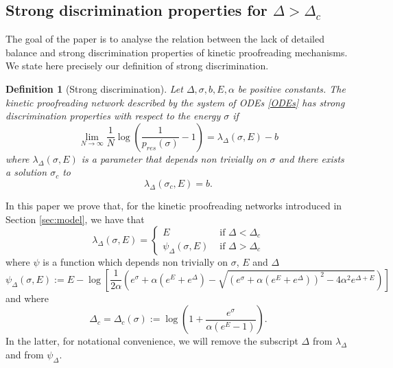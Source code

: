 \documentclass{article}
\numberwithin{equation}{section}
\theoremstyle{plain}
\newtheorem{definition}[theorem]{Definition}
\begin{document}
\subsection{Strong discrimination properties for $\Delta > \Delta_c$ }
The goal of the paper is to analyse the relation between the lack of detailed balance and strong discrimination properties of kinetic proofreading mechanisms. We state here  precisely our definition of strong discrimination. 
\begin{definition}[Strong discrimination] \label{def:strong discr}
Let $\Delta, \sigma, b, E , \alpha  $ be positive constants. 
    The kinetic proofreading network described by the system of ODEs \eqref{ODEs} has strong discrimination properties with respect to the energy $\sigma$  if 
\begin{equation} \label{strong disc}
\lim_{N \to \infty}    \frac{1}{N } \log \left( \frac{1}{p_{res} (\sigma) } - 1 \right) = \lambda_\Delta (\sigma, E) - b 
\end{equation}
    where  $ \lambda_\Delta (\sigma, E )$ is a parameter that depends non trivially on  $\sigma $  and there exists a solution $\sigma_c $ to 
    \begin{equation} \label{sigma cirt}
\lambda_\Delta(\sigma_c, E)= b. 
\end{equation} 
\end{definition}
In this paper we prove that, for the kinetic proofreading networks introduced in Section \ref{sec:model}, we have that
\begin{equation} \label{lambda}
\lambda_\Delta  (\sigma, E )=\begin{cases}  E &\text{ if } \Delta < \Delta_c \\
\psi_\Delta (\sigma, E) &\text{ if } \Delta > \Delta_c
\end{cases} 
\end{equation}
where $\psi$ is a function which depends non trivially on $\sigma$, $E$ and $\Delta$
\begin{equation} \label{psi}
\psi_\Delta(\sigma , E ) := E - \log \left[ \frac{1}{2 \alpha } \left( e^\sigma + \alpha (e^E+ e^\Delta) - \sqrt{ (e^\sigma + \alpha (e^E+ e^\Delta) )^2 - 4 \alpha^2 e^{\Delta + E }} \right) \right]
\end{equation}
and where 
\begin{equation}\label{Delta_c}
\Delta_c= \Delta_c (\sigma)  := \log \left( 1+ \frac{e^\sigma }{\alpha (e^E-1 ) } \right).  
\end{equation}
In the latter, for notational convenience, we will remove the subscript $\Delta $ from $\lambda_\Delta $ and from $\psi_\Delta $. 
 
\end{document}
